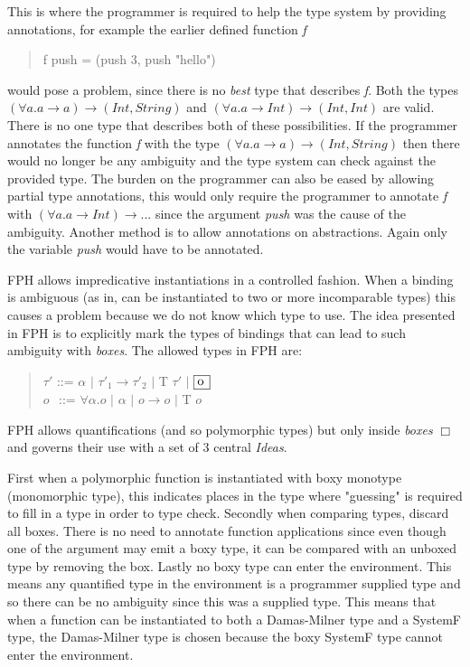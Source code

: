 \documentclass[twoside, titlepage, openright, a4paper]{book}
\begin{document}
This is where the programmer is required to help the type system by providing annotations, for example the earlier defined function \emph{f}
\begin{quotation}
f push = (push 3, push "hello")
\end{quotation}
would pose a problem, since there is no \emph{best} type that describes \emph{f}. Both the types $(\forall a. a \rightarrow a) \rightarrow (Int, String)$ and $(\forall a. a \rightarrow Int) \rightarrow (Int, Int)$ are valid. There is no one type that describes both of these possibilities.
If the programmer annotates the function \emph{f} with the type $(\forall a. a \rightarrow a) \rightarrow (Int, String)$ then there would no longer be any ambiguity and the type system can check against the provided type.
The burden on the programmer can also be eased by allowing partial type annotations, this would only require the programmer to annotate \emph{f} with $(\forall a. a \rightarrow Int) \rightarrow ...$ since the argument \emph{push} was the cause of the ambiguity. Another method is to allow annotations on abstractions. Again only the variable \emph{push} would have to be annotated.

FPH allows impredicative instantiations in a controlled fashion. When a binding is ambiguous (as in, can be instantiated to two or more incomparable types) this causes a problem because we do not know which type to use. The idea presented in FPH is to explicitly mark the types of bindings that can lead to such ambiguity with \textit{boxes}. The allowed types in FPH are:

\begin{quotation}
$\tau'$ ::= $\alpha$ $|$  $\tau'_1 \rightarrow \tau'_2$ $|$ T $\tau'$ $|$ $\framebox[0.45cm][l]{o}$ \\
\indent $o$ $\hspace{1pt}$ ::= $\forall \alpha.o$ $|$ $\alpha$ $|$ $o \rightarrow o$ $|$ T $o$
\end{quotation}

FPH allows quantifications (and so polymorphic types) but only inside \emph{boxes} $\Box$ and governs their use with a set of 3 central \textit{Ideas}\cite{FPH}.

First when a polymorphic function is instantiated with boxy monotype (monomorphic type), this indicates places in the type where "guessing" is required to fill in a type in order to type check.
Secondly when comparing types, discard all boxes. There is no need to annotate function applications since even though one of the argument may emit a boxy type, it can be compared with an unboxed type by removing the box.
Lastly no boxy type can enter the environment. This means any quantified type in the environment is a programmer supplied type and so there can be no ambiguity since this was a supplied type. This means that when a function can be instantiated to both a Damas-Milner type and a SystemF type, the Damas-Milner type is chosen because the boxy SystemF type cannot enter the environment.
\end{document}
